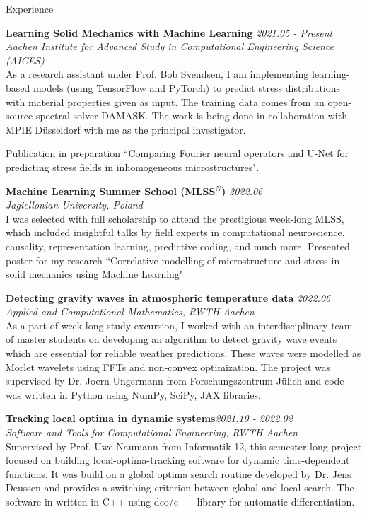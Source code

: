 \documentclass{resume} %
\begin{document}

\begin{rSection}{Experience}

{\bf Learning Solid Mechanics with Machine Learning} \hfill {\em 2021.05 - Present}\\
{\em Aachen Institute for Advanced Study in Computational Engineering Science (AICES)}\\
As a research assistant under Prof. Bob Svendsen, I am implementing learning-based models (using TensorFlow and PyTorch) to predict stress distributions with material properties given as input. The training data comes from an open-source spectral solver \textemdash DAMASK. The work is being done in collaboration with MPIE Düsseldorf with me as the principal investigator.

Publication in preparation \textemdash ``Comparing Fourier neural operators and U-Net for predicting stress fields in inhomogeneous microstructures".

{\bf Machine Learning Summer School (MLSS\(^N\))} \hfill {\em 2022.06}\\
{\em Jagiellonian University, Poland}\\
I was selected with full scholarship to attend the prestigious week-long MLSS, which included insightful talks by field experts in computational neuroscience, causality, representation learning, predictive coding, and much more. Presented poster for my research \textemdash ``Correlative modelling of microstructure and stress in solid mechanics using Machine Learning"

{\bf Detecting gravity waves in atmospheric temperature data} \hfill {\em2022.06}\\
{\em Applied and Computational Mathematics, RWTH Aachen}\\
As a part of week-long study excursion, I worked with an interdisciplinary team of master students on developing an algorithm to detect gravity wave events which are essential for reliable weather predictions. These waves were modelled as Morlet wavelets using FFTs and non-convex optimization. The project was supervised by Dr. Joern Ungermann from Forschungszentrum Jülich and code was written in Python using NumPy, SciPy, JAX libraries.

{\bf Tracking local optima in dynamic systems}\hfill {\em 2021.10 - 2022.02}\\
{\em Software and Tools for Computational Engineering, RWTH Aachen}\\
Supervised by Prof. Uwe Naumann from Informatik-12, this semester-long project focused on building local-optima-tracking software for dynamic time-dependent functions. It was build on a global optima search routine developed by Dr. Jens Deussen and provides a switching criterion between global and local search.  The software in written in C++ using dco/c++ library for automatic differentiation. 


\end{rSection}
\end{document}
